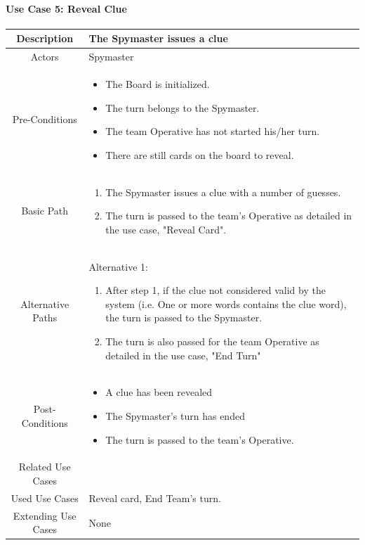 \documentclass[10pt, a4paper]{article}
\begin{document}
	\paragraph{Use Case 5: Reveal Clue}
		\begin{center}
		\begin{tabular}{ |c|p{10cm}| } 
			\hline
			Description & The Spymaster issues a clue \\ 
			\hline
			Actors & Spymaster \\
			\hline 
			Pre-Conditions & \begin{itemize}[noitemsep,topsep=0pt]
				\item The Board is initialized.
				\item The turn belongs to the Spymaster.
				\item The team Operative has not started his/her turn.
				\item There are still cards on the board to reveal.
			\end{itemize} \\
			\hline
			Basic Path & 
				\begin{enumerate}
					\item The Spymaster issues a clue with a number of guesses.
					\item The turn is passed to the team's Operative as detailed in the use case, "Reveal Card". 
				\end{enumerate} \\
			\hline 
			Alternative Paths & Alternative 1:
				\begin{enumerate}
					\item After step 1, if the clue not considered valid by the system (i.e. One or more words contains the clue word), the turn is passed to the Spymaster.
					\item The turn is also passed for the team Operative as detailed in the use case, "End Turn"
				\end{enumerate}\\
			\hline 
			Post-Conditions & 
				\begin{itemize}[noitemsep,topsep=0pt]
					\item A clue has been revealed
					\item The Spymaster’s turn has ended 
					\item The turn is passed to the team's Operative.
				\end{itemize} \\
			\hline 
			Related Use Cases & \\
			\hline 
			Used Use Cases & Reveal card, End Team's turn. \\
			\hline
			Extending Use Cases & None \\
			\hline
		\end{tabular}
	\end{center}
\end{document}
